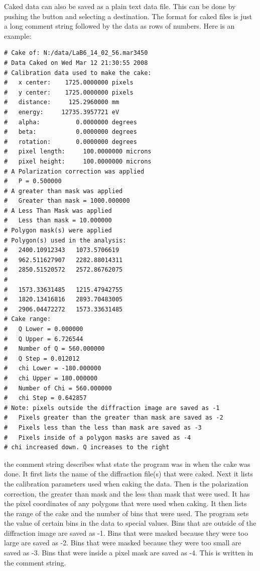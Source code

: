 Caked data can also be saved as a plain text data file.
This can be done by pushing the  button and
selecting a destination. The format for caked files is just
a long comment string followed by the data as rows of numbers.
Here is an example:
\begin{lstlisting}[caption={'caked\_data.dat'}]
# Cake of: N:/data/LaB6_14_02_56.mar3450 
# Data Caked on Wed Mar 12 21:30:55 2008
# Calibration data used to make the cake:
#   x center:    1725.0000000 pixels
#   y center:    1725.0000000 pixels
#   distance:     125.2960000 mm
#   energy:     12735.3957721 eV
#   alpha:          0.0000000 degrees
#   beta:           0.0000000 degrees
#   rotation:       0.0000000 degrees
#   pixel length:     100.0000000 microns
#   pixel height:     100.0000000 microns
# A Polarization correction was applied
#   P = 0.500000
# A greater than mask was applied
#   Greater than mask = 1000.000000
# A Less Than Mask was applied
#   Less than mask = 10.000000
# Polygon mask(s) were applied
# Polygon(s) used in the analysis:
#   2400.10912343	1073.5706619
#   962.511627907	2282.88014311
#   2850.51520572	2572.86762075
#
#   1573.33631485	1215.47942755
#   1820.13416816	2893.70483005
#   2906.04472272	1573.33631485
# Cake range:
#   Q Lower = 0.000000
#   Q Upper = 6.726544
#   Number of Q = 560.000000
#   Q Step = 0.012012
#   chi Lower = -180.000000
#   chi Upper = 180.000000
#   Number of Chi = 560.000000
#   chi Step = 0.642857
# Note: pixels outside the diffraction image are saved as -1
#   Pixels greater than the greater than mask are saved as -2
#   Pixels less than the less than mask are saved as -3
#   Pixels inside of a polygon masks are saved as -4
# chi increased down. Q increases to the right
\end{lstlisting}
the comment string describes what state the program was in when the 
cake was done. It first lists the name of the diffraction 
file(s) that were caked. Next it lists the calibration parameters 
used when caking the data. Then is the polarization correction, the greater 
than mask and the less than mask that were used. It has the pixel 
coordinates of any polygons that were used when caking.  It then lists 
the range of the cake and the number of bins that were used.
The program sets the value of certain bins in the data
to special values. Bins that are outside of the diffraction
image are saved as -1. Bins that were masked because they were too 
large are saved as -2. Bins that were masked because they were too 
small are saved as -3. Bins that were inside a pixel mask are saved 
as -4. This is written in the comment string. 

